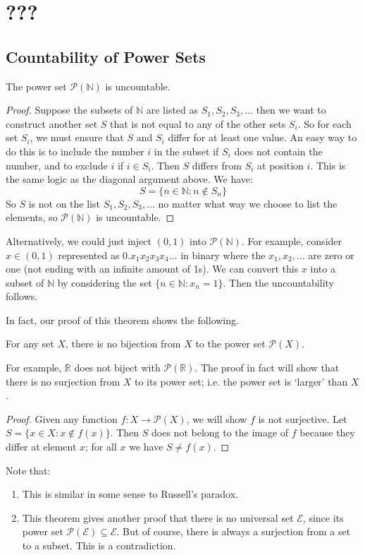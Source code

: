 \documentclass{article}
\begin{document}
	\section{???}
	\subsection{Countability of Power Sets}
	\begin{theorem}
		The power set $\mathcal P(\mathbb N)$ is uncountable.
	\end{theorem}
	\begin{proof}
		Suppose the subsets of $\mathbb N$ are listed as $S_1, S_2, S_3, \dots$ then we want to construct another set $S$ that is not equal to any of the other sets $S_i$. So for each set $S_i$, we must ensure that $S$ and $S_i$ differ for at least one value. An easy way to do this is to include the number $i$ in the subset if $S_i$ does not contain the number, and to exclude $i$ if $i \in S_i$. Then $S$ differs from $S_i$ at position $i$. This is the same logic as the diagonal argument above. We have:
		\[ S = \{ n \in \mathbb N : n \notin S_n \} \]
		So $S$ is not on the list $S_1, S_2, S_3, \dots$ no matter what way we choose to list the elements, so $\mathcal P(\mathbb N)$ is uncountable.
	\end{proof}
	\begin{remark}
		Alternatively, we could just inject $(0, 1)$ into $\mathcal P(\mathbb N)$. For example, consider $x \in (0, 1)$ represented as $0.x_1x_2x_3x_4\dots$ in binary where the $x_1, x_2, \dots$ are zero or one (not ending with an infinite amount of 1s). We can convert this $x$ into a subset of $\mathbb N$ by considering the set $\{ n \in \mathbb N : x_n = 1 \}$. Then the uncountability follows.
	\end{remark}
	In fact, our proof of this theorem shows the following.
	\begin{theorem}
		For any set $X$, there is no bijection from $X$ to the power set $\mathcal P(X)$.
	\end{theorem}
	For example, $\mathbb R$ does not biject with $\mathcal P(\mathbb R)$. The proof in fact will show that there is no surjection from $X$ to its power set; i.e. the power set is `larger' than $X$.
	\begin{proof}
		Given any function $f\colon X \to \mathcal P(X)$, we will show $f$ is not surjective. Let $S = \{ x \in X: x \notin f(x) \}$. Then $S$ does not belong to the image of $f$ because they differ at element $x$; for all $x$ we have $S \neq f(x)$.
	\end{proof}
	\begin{remark}
		Note that:
		\begin{enumerate}
			\item This is similar in some sense to Russell's paradox.
			\item This theorem gives another proof that there is no universal set $\mathscr E$, since its power set $\mathcal P(\mathscr E) \subseteq \mathscr E$. But of course, there is always a surjection from a set to a subset. This is a contradiction.
		\end{enumerate}
	\end{remark}
\end{document}
